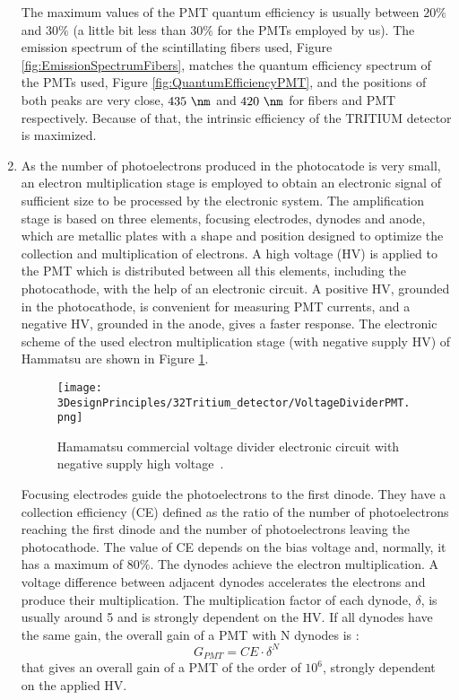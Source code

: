 \begin{enumerate}
The maximum values of the PMT quantum efficiency is usually between $20\%$ and $30\%$ \cite{Knoll} (a little bit less than $30\%$ for the PMTs employed by us). The emission spectrum of the scintillating fibers used, Figure \ref{fig:EmissionSpectrumFibers}, matches the quantum efficiency spectrum of the PMTs used, Figure \ref{fig:QuantumEfficiencyPMT}, and the positions of both peaks are very close, $435~\nm$ and $420~\nm$ for fibers and PMT respectively. Because of that, the intrinsic efficiency of the TRITIUM detector is maximized.

\item{} As the number of photoelectrons produced in the photocatode is very small, an electron multiplication stage is employed to obtain an electronic signal of sufficient size to be processed by the electronic system. The amplification stage is based on three elements, focusing electrodes, dynodes and anode, which are metallic plates with a shape and position designed to optimize the collection and multiplication of electrons. A high voltage (HV) is applied to the PMT which is distributed between all this elements, including the photocathode, with the help of an electronic circuit. A positive HV, grounded in the photocathode, is convenient for measuring PMT currents, and a negative HV, grounded in the anode, gives a faster response. The electronic scheme of the used electron multiplication stage (with negative supply HV) of Hammatsu are shown in Figure \ref{fig:VoltageDividerCircuit}.

\begin{figure}[h]
\centering
\texttt{[image: 3DesignPrinciples/32Tritium\_detector/VoltageDividerPMT.png]}
\caption{Hamamatsu commercial voltage divider electronic circuit with negative supply high voltage\label{fig:VoltageDividerCircuit}~\cite{DataSheetPMTs}.}
\end{figure}


Focusing electrodes guide the photoelectrons to the first dinode. They have a collection efficiency (CE) defined as the ratio of the number of photoelectrons reaching the first dinode and the number of photoelectrons leaving the photocathode. The value of CE depends on the bias voltage and, normally, it has a maximum of $80\%$. The dynodes achieve the electron multiplication. A voltage difference between adjacent dynodes accelerates the electrons and produce their multiplication. The multiplication factor of each dynode, $\delta$, is usually around 5 and is strongly dependent on the HV. If all dynodes have the same gain, the overall gain of a PMT with N dynodes is \cite{Knoll}:
\begin{equation}
G_{PMT} = CE\cdot{} \delta^N
\label{eq:PMTGain}
\end{equation}
that gives an overall gain of a PMT of the order of $10^6$, strongly dependent on the applied HV.


\end{enumerate}
